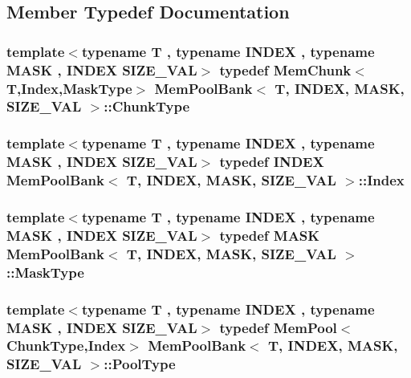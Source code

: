 \subsection{Member Typedef Documentation}
\hypertarget{structMemPoolBank_a5fa9a36b46ad0ecb5dbbfa0bd105dcb6}{
\subsubsection[{Chunk\-Type}]{\setlength{\rightskip}{0pt plus 5cm}template$<$typename T , typename I\-N\-D\-E\-X , typename M\-A\-S\-K , I\-N\-D\-E\-X S\-I\-Z\-E\-\_\-\-V\-A\-L$>$ typedef {\bf Mem\-Chunk}$<$T,{\bf Index},{\bf Mask\-Type}$>$ {\bf Mem\-Pool\-Bank}$<$ T, I\-N\-D\-E\-X, M\-A\-S\-K, S\-I\-Z\-E\-\_\-\-V\-A\-L $>$\-::{\bf Chunk\-Type}}}\label{structMemPoolBank_a5fa9a36b46ad0ecb5dbbfa0bd105dcb6}
\hypertarget{structMemPoolBank_a5f3e0490f2f4fe5dbf321cc00eb35007}{
\subsubsection[{Index}]{\setlength{\rightskip}{0pt plus 5cm}template$<$typename T , typename I\-N\-D\-E\-X , typename M\-A\-S\-K , I\-N\-D\-E\-X S\-I\-Z\-E\-\_\-\-V\-A\-L$>$ typedef I\-N\-D\-E\-X {\bf Mem\-Pool\-Bank}$<$ T, I\-N\-D\-E\-X, M\-A\-S\-K, S\-I\-Z\-E\-\_\-\-V\-A\-L $>$\-::{\bf Index}}}\label{structMemPoolBank_a5f3e0490f2f4fe5dbf321cc00eb35007}
\hypertarget{structMemPoolBank_a35d618e084e7be124feef368925d46d5}{
\subsubsection[{Mask\-Type}]{\setlength{\rightskip}{0pt plus 5cm}template$<$typename T , typename I\-N\-D\-E\-X , typename M\-A\-S\-K , I\-N\-D\-E\-X S\-I\-Z\-E\-\_\-\-V\-A\-L$>$ typedef M\-A\-S\-K {\bf Mem\-Pool\-Bank}$<$ T, I\-N\-D\-E\-X, M\-A\-S\-K, S\-I\-Z\-E\-\_\-\-V\-A\-L $>$\-::{\bf Mask\-Type}}}\label{structMemPoolBank_a35d618e084e7be124feef368925d46d5}
\hypertarget{structMemPoolBank_afae3596e9bd9f9245bc55fbe47356e96}{
\subsubsection[{Pool\-Type}]{\setlength{\rightskip}{0pt plus 5cm}template$<$typename T , typename I\-N\-D\-E\-X , typename M\-A\-S\-K , I\-N\-D\-E\-X S\-I\-Z\-E\-\_\-\-V\-A\-L$>$ typedef {\bf Mem\-Pool}$<${\bf Chunk\-Type},{\bf Index}$>$ {\bf Mem\-Pool\-Bank}$<$ T, I\-N\-D\-E\-X, M\-A\-S\-K, S\-I\-Z\-E\-\_\-\-V\-A\-L $>$\-::{\bf Pool\-Type}}}\label{structMemPoolBank_afae3596e9bd9f9245bc55fbe47356e96}


